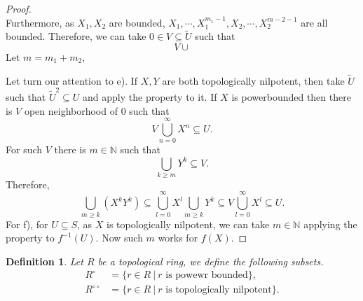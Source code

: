 \documentclass[8pt]{article}
\numberwithin{equation}{section}
\newtheorem{definition}{Definition}[subsection]
\newcommand{\N}[0]{\mathbb{N}}
\newcommand{\sep}[0]{\:|\:}
\begin{document}
\begin{proof}
\begin{equation*}
    \end{equation*}
    Furthermore, as $X_1,X_2$ are bounded, $X_1,\cdots,X_1^{m_1-1},X_2,\cdots,X_2^{m-2-1}$ are all bounded. Therefore, we can take $0\in V\subseteq\tilde{U}$ such that 
    \begin{equation*}
        V\cup 
    \end{equation*}Let $m=m_1+m_2$, 
    \par Let turn our attention to e). If $X,Y$ are both topologically nilpotent, then take $\tilde{U}$ such that $\tilde{U}^2\subseteq U$ and apply the property to it. If $X$ is powerbounded then there is $V$ open neighborhood of $0$ such that 
    \begin{equation*}
        V\bigcup_{n=0}^\infty X^n \subseteq U.
    \end{equation*}
    For such $V$ there is $m\in \N$ such that 
    \begin{equation*}
        \bigcup_{k\geq m} Y^k\subseteq V.
    \end{equation*}
    Therefore,
    \begin{equation*}
        \bigcup_{m\geq k} (X^kY^k) \subseteq \bigcup_{l=0}^\infty X^l \bigcup_{m\geq k}Y^k \subseteq V\bigcup_{l=0}^\infty X^l\subseteq U.
    \end{equation*}
    For f), for $U\subseteq S$, as $X$ is topologically nilpotent, we can take $m\in\N$ applying the property to $f^{-1}(U)$. Now such $m$ works for $f(X)$.
\end{proof}
\begin{definition}
    \label{definition_11_4}
    Let $R$ be a topological ring, we define the following subsets.
    \begin{align*}
        R^\circ & = \{r\in R\sep \text{$r$ is powewr bounded}\},\\
        R^{\circ\circ}&=\{r\in R\sep \text{$r$ is topologically nilpotent}\}.
    \end{align*}
\end{definition}
\end{document}
